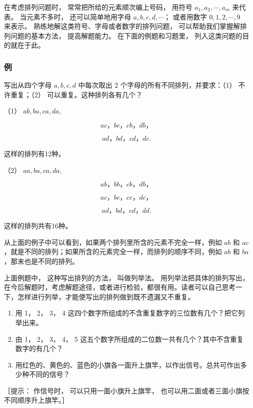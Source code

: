 在考虑排列问题时， 常常把所给的元素顺次编上号码， 用符号
\(a_{1}, a_{2}, \cdots, a_{m}\) 来代表。 当元素不多时，
还可以简单地用字母 \(a, b, c, d, \cdots\)； 或者用数字
\(0, 1, 2, \cdots, 9\) 来表示。
熟练地解这类符号、字母或者数字的排列问题，
可以帮助我们掌握解排列问题的基本方法， 提高解题能力。
在下面的例题和习题里， 列入这类问题的目的就在于此。

\subsubsection{例}

写出从四个字母 \(a, b, c, d\) 中每次取出 2
个字母的所有不同排列，并要求：（1） 不许重复；（2）
可以重复。这种排列各有几个？

 （1） \(ab, ba, ca, da,\)

\[
a c\text{，} b c\text{，} c b\text{，} d b\text{，}
\]

\[
a d\text{，} b d\text{，} c d\text{，} d c.
\]

这样的排列有12种。

（2） \(aa, ba, ca, da,\)

\[
a b\text{，} b b\text{，} c b\text{，} d b\text{，}
\]

\[
a c\text{，} b c\text{，} c c\text{，} d c\text{，}
\]

\[
a d\text{，} b d\text{，} c d\text{，} d d.
\]

这样的排列共有16种。

从上面的例子中可以看到，如果两个排列里所含的元素不完全一样，例如 \(ab\)
和
\(ac\)，就是不同的排列；如果所含的元素完全一样，而排列的顺序不同，例如
\(ab\) 和 \(ba\)，那末也是不同的排列。

 上面例题中， 这种写出排列的方法， 叫做列举法。
用列举法把具体的排列写出，在今后解题时，考虑解题途径，或者进行检验，都很有用。读者可以自己思考一下，怎样进行列举，才能使写出的排列做到既不遗漏又不重复。

\begin{enumerate}
\item
  用 1， 2， 3， 4
  这四个数字所组成的不含重复数字的三位数有几个？把它列举出来。
\item
  由 1， 2， 3， 4， 5
  这五个数字所组成的二位数一共有几个？其中不含重复数字的有几个？
\item
  用红色的、黄色的、蓝色的小旗各一面升上旗竿，以作出信号。总共可作出多少种不同的信号？
\end{enumerate}

［提示： 作信号时， 可以只用一面小旗升上旗竿，
也可以用二面或者三面小旗按不同顺序升上旗竿。］

